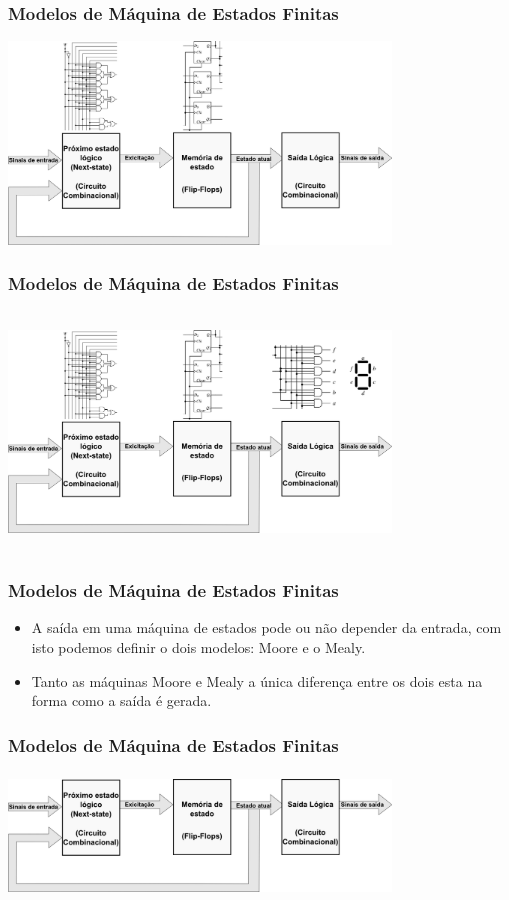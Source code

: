 \documentclass{beamer}
\begin{document}
\begin{frame}
  \frametitle{Modelos de Máquina de Estados Finitas}
    \includegraphics[height = 2in.5, width = 4in]{modelo_5.png}
\end{frame}

\begin{frame}
  \frametitle{Modelos de Máquina de Estados Finitas}
    \includegraphics[height = 2.5in, width = 4in]{modelo_6.png}
\end{frame}

\begin{frame}
  \frametitle{Modelos de Máquina de Estados Finitas}
  \begin{itemize}
    \item A saída em uma máquina de estados pode ou não depender da entrada, com isto podemos definir o dois modelos: Moore e o Mealy.\pause
    \item Tanto as máquinas Moore e Mealy a única diferença entre os dois esta na forma como a saída é gerada.
  \end{itemize}
\end{frame}

\begin{frame}
  \frametitle{Modelos de Máquina de Estados Finitas}
    \includegraphics[height = 1.3in, width = 4in]{modelo_7.png}
\end{frame}
\end{document}
